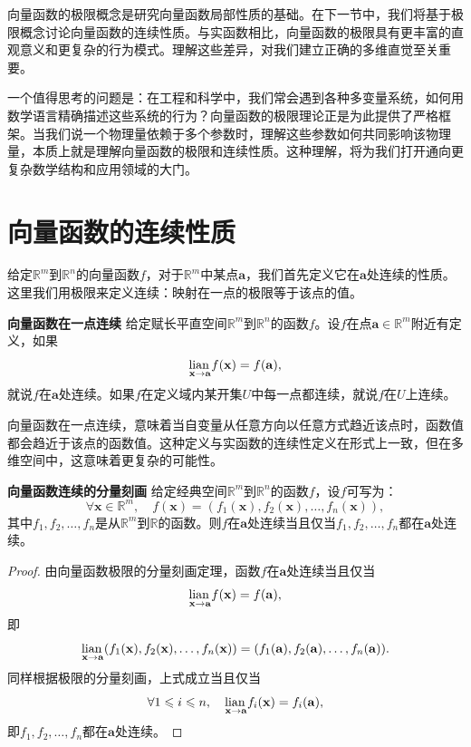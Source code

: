 \documentclass[12pt,UTF8,fontset=none]{ctexbook}
\begin{document}
向量函数的极限概念是研究向量函数局部性质的基础。在下一节中，我们将基于极限概念讨论向量函数的连续性质。与实函数相比，向量函数的极限具有更丰富的直观意义和更复杂的行为模式。理解这些差异，对我们建立正确的多维直觉至关重要。

一个值得思考的问题是：在工程和科学中，我们常会遇到各种多变量系统，如何用数学语言精确描述这些系统的行为？向量函数的极限理论正是为此提供了严格框架。当我们说一个物理量依赖于多个参数时，理解这些参数如何共同影响该物理量，本质上就是理解向量函数的极限和连续性质。这种理解，将为我们打开通向更复杂数学结构和应用领域的大门。

\section{向量函数的连续性质}
给定$\mathbb{R}^m$到$\mathbb{R}^n$的向量函数$f$，对于$\mathbb{R}^m$中某点$\mathbf{a}$，我们首先定义它在$\mathbf{a}$处连续的性质。这里我们用极限来定义连续：映射在一点的极限等于该点的值。

\begin{df}{\textbf{向量函数在一点连续}}
给定赋长平直空间$\mathbb{R}^m$到$\mathbb{R}^n$的函数$f$。设$f$在点$\mathbf{a}\in\mathbb{R}^m$附近有定义，如果
$$ \underset{\mathbf{x}\to \mathbf{a}}{\operatorname{lian}\,} f(\mathbf{x}) = f(\mathbf{a}), $$
就说$f$在$\mathbf{a}$处连续。如果$f$在定义域内某开集$U$中每一点都连续，就说$f$在$U$上连续。
\end{df}

向量函数在一点连续，意味着当自变量从任意方向以任意方式趋近该点时，函数值都会趋近于该点的函数值。这种定义与实函数的连续性定义在形式上一致，但在多维空间中，这意味着更复杂的可能性。


\begin{tm}{\textbf{向量函数连续的分量刻画}}
给定经典空间$\mathbb{R}^m$到$\mathbb{R}^n$的函数$f$，设$f$可写为：
$$ \forall \mathbf{x} \in \mathbb{R}^m, \quad f(\mathbf{x}) = (f_1(\mathbf{x}), f_2(\mathbf{x}), \ldots, f_n(\mathbf{x})), $$
其中$f_1, f_2, \ldots, f_n$是从$\mathbb{R}^m$到$\mathbb{R}$的函数。则$f$在$\mathbf{a}$处连续当且仅当$f_1, f_2, \ldots, f_n$都在$\mathbf{a}$处连续。
\end{tm}

\begin{proof}
由向量函数极限的分量刻画定理，函数$f$在$\mathbf{a}$处连续当且仅当
$$ \underset{\mathbf{x}\to \mathbf{a}}{\operatorname{lian}\,} f(\mathbf{x}) = f(\mathbf{a}), $$
即
$$ \underset{\mathbf{x}\to \mathbf{a}}{\operatorname{lian}\,} (f_1(\mathbf{x}), f_2(\mathbf{x}), \ldots, f_n(\mathbf{x})) = (f_1(\mathbf{a}), f_2(\mathbf{a}), \ldots, f_n(\mathbf{a})). $$
同样根据极限的分量刻画，上式成立当且仅当
$$ \forall 1 \leqslant i \leqslant n, \quad \underset{\mathbf{x}\to \mathbf{a}}{\operatorname{lian}\,} f_i(\mathbf{x}) = f_i(\mathbf{a}), $$
即$f_1, f_2, \ldots, f_n$都在$\mathbf{a}$处连续。
\end{proof}
\end{document}
